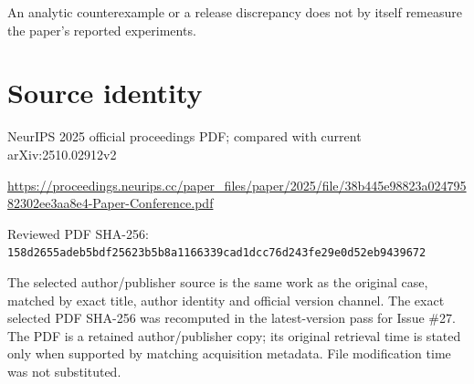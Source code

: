 \documentclass[11pt]{article}
\begin{document}
An analytic counterexample or a release discrepancy does not by itself remeasure the paper’s reported experiments.\par

\section*{Source identity}

NeurIPS 2025 official proceedings PDF; compared with current arXiv:2510.02912v2

\url{https://proceedings.neurips.cc/paper_files/paper/2025/file/38b445e98823a02479582302ee3aa8e4-Paper-Conference.pdf}

Reviewed PDF SHA-256: \nolinkurl{158d2655adeb5bdf25623b5b8a1166339cad1dcc76d243fe29e0d52eb9439672}

The selected author/publisher source is the same work as the original case, matched by exact title, author identity and official version channel. The exact selected PDF SHA-256 was recomputed in the latest-version pass for Issue \#27. The PDF is a retained author/publisher copy; its original retrieval time is stated only when supported by matching acquisition metadata. File modification time was not substituted.
\end{document}
